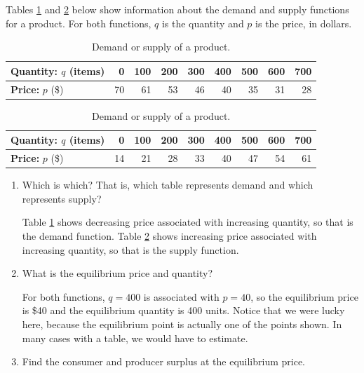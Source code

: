 \begin{example}
Tables \ref{tab:5-8-demand} and \ref{tab:5-8-supply} below show information about the demand and supply functions for a product. For both functions, $q$ is the quantity and $p$ is the price, in dollars.

\begin{table}[ht!]
    \centering
    \begin{tabular}{l*{8}{r}}
    \toprule
    {\bf Quantity:} $q$ (items) & 0 & 	100	 & 200	 & 300	 & 400	 & 500	 & 600	 & 700\tabularnewline
    \midrule
    {\bf Price:} $p$ (\$) & 70 & 	61 & 	53 & 	46 & 	40 & 	35 & 	31 & 	28\tabularnewline
    \bottomrule
    \end{tabular}
    \caption{Demand or supply of a product.}
    \label{tab:5-8-demand}
\end{table}
\begin{table}[ht!]
    \centering
    \begin{tabular}{l*{8}{r}}
    \toprule
    {\bf Quantity:} $q$ (items) & 0 & 	100	 & 200	 & 300	 & 400	 & 500	 & 600	 & 700\tabularnewline
    \midrule
    {\bf Price:} $p$ (\$)       & 14 & 	21 & 	28 & 	33 & 	40 & 	47 & 	54 & 	61\tabularnewline
    \bottomrule
    \end{tabular}
    \caption{Demand or supply of a product.}
    \label{tab:5-8-supply}
\end{table}
  \begin{enumerate}[label=(\alph*)]
    \item Which is which? That is, which table represents demand and which represents supply?

    \begin{solution}
      Table \ref{tab:5-8-demand} shows decreasing price associated with increasing quantity, so that is the demand function. Table \ref{tab:5-8-supply} shows increasing price associated with increasing quantity, so that is the supply function.
    \end{solution}
    \item What is the equilibrium price and quantity?

    \begin{solution}
For both functions, $q=400$ is associated with $p=40$, so the equilibrium price is \$40 and the equilibrium quantity is 400 units. Notice that we were lucky here, because the equilibrium point is actually one of the points shown. In many cases with a table, we would have to estimate.
    \end{solution}
    \item Find the consumer and producer surplus at the equilibrium price.


\end{enumerate}
\end{example}
